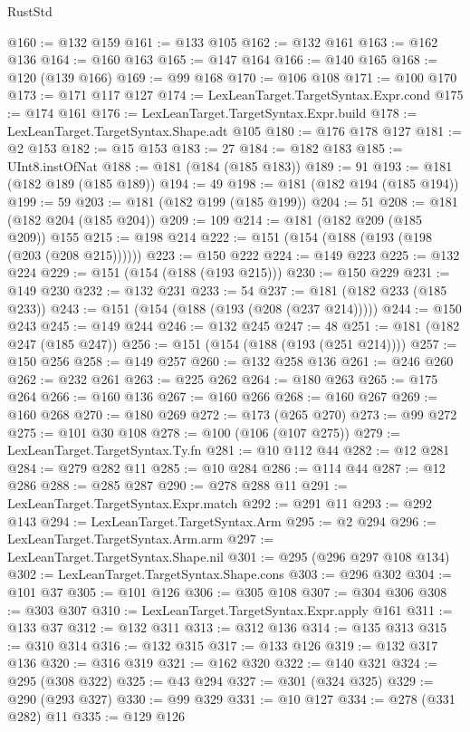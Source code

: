 \begin{lexlean}{RustStd}
\begin{coremodule}
{\begin{coremodule}
{{{{{{{{{{{{{{{{{{{{{{{{{{{{{{{@160 := @132 @159
@161 := @133 @105
@162 := @132 @161
@163 := @162 @136
@164 := @160 @163
@165 := @147 @164
@166 := @140 @165
@168 := @120 (@139 @166)
@169 := @99 @168
@170 := @106 @108
@171 := @100 @170
@173 := @171 @117 @127
@174 := LexLeanTarget.TargetSyntax.Expr.cond
@175 := @174 @161
@176 := LexLeanTarget.TargetSyntax.Expr.build
@178 := LexLeanTarget.TargetSyntax.Shape.adt @105
@180 := @176 @178 @127
@181 := @2 @153
@182 := @15 @153
@183 := 27
@184 := @182 @183
@185 := UInt8.instOfNat
@188 := @181 (@184 (@185 @183))
@189 := 91
@193 := @181 (@182 @189 (@185 @189))
@194 := 49
@198 := @181 (@182 @194 (@185 @194))
@199 := 59
@203 := @181 (@182 @199 (@185 @199))
@204 := 51
@208 := @181 (@182 @204 (@185 @204))
@209 := 109
@214 := @181 (@182 @209 (@185 @209)) @155
@215 := @198 @214
@222 := @151 (@154 (@188 (@193 (@198 (@203 (@208 @215))))))
@223 := @150 @222
@224 := @149 @223
@225 := @132 @224
@229 := @151 (@154 (@188 (@193 @215)))
@230 := @150 @229
@231 := @149 @230
@232 := @132 @231
@233 := 54
@237 := @181 (@182 @233 (@185 @233))
@243 := @151 (@154 (@188 (@193 (@208 (@237 @214)))))
@244 := @150 @243
@245 := @149 @244
@246 := @132 @245
@247 := 48
@251 := @181 (@182 @247 (@185 @247))
@256 := @151 (@154 (@188 (@193 (@251 @214))))
@257 := @150 @256
@258 := @149 @257
@260 := @132 @258 @136
@261 := @246 @260
@262 := @232 @261
@263 := @225 @262
@264 := @180 @263
@265 := @175 @264
@266 := @160 @136
@267 := @160 @266
@268 := @160 @267
@269 := @160 @268
@270 := @180 @269
@272 := @173 (@265 @270)
@273 := @99 @272
@275 := @101 @30 @108
@278 := @100 (@106 (@107 @275))
@279 := LexLeanTarget.TargetSyntax.Ty.fn
@281 := @10 @112 @44
@282 := @12 @281
@284 := @279 @282 @11
@285 := @10 @284
@286 := @114 @44
@287 := @12 @286
@288 := @285 @287
@290 := @278 @288 @11
@291 := LexLeanTarget.TargetSyntax.Expr.match
@292 := @291 @11
@293 := @292 @143
@294 := LexLeanTarget.TargetSyntax.Arm
@295 := @2 @294
@296 := LexLeanTarget.TargetSyntax.Arm.arm
@297 := LexLeanTarget.TargetSyntax.Shape.nil
@301 := @295 (@296 @297 @108 @134)
@302 := LexLeanTarget.TargetSyntax.Shape.cons
@303 := @296 @302
@304 := @101 @37
@305 := @101 @126
@306 := @305 @108
@307 := @304 @306
@308 := @303 @307
@310 := LexLeanTarget.TargetSyntax.Expr.apply @161
@311 := @133 @37
@312 := @132 @311
@313 := @312 @136
@314 := @135 @313
@315 := @310 @314
@316 := @132 @315
@317 := @133 @126
@319 := @132 @317 @136
@320 := @316 @319
@321 := @162 @320
@322 := @140 @321
@324 := @295 (@308 @322)
@325 := @43 @294
@327 := @301 (@324 @325)
@329 := @290 (@293 @327)
@330 := @99 @329
@331 := @10 @127
@334 := @278 (@331 @282) @11
@335 := @129 @126
}}}}}}}}}}}}}}}}}}}}}}}}}}}}}}}
\end{coremodule}}
\end{coremodule}
\end{lexlean}
